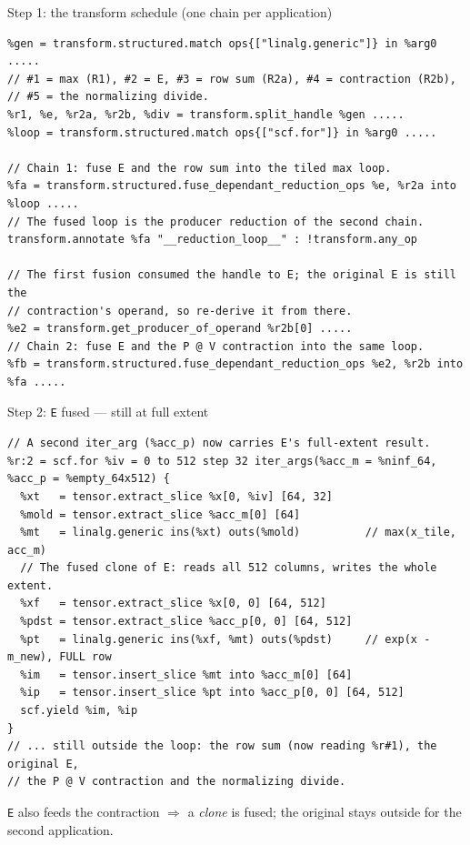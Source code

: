 \documentclass[10pt, aspectratio=169]{beamer}
\newcommand{\code}[1]{\texttt{\small #1}}
\begin{document}
\begin{frame}[fragile]{Step 1: the transform schedule (one chain per application)}
\begin{lstlisting}
%gen = transform.structured.match ops{["linalg.generic"]} in %arg0 .....
// #1 = max (R1), #2 = E, #3 = row sum (R2a), #4 = contraction (R2b),
// #5 = the normalizing divide.
%r1, %e, %r2a, %r2b, %div = transform.split_handle %gen .....
%loop = transform.structured.match ops{["scf.for"]} in %arg0 .....

// Chain 1: fuse E and the row sum into the tiled max loop.
%fa = transform.structured.fuse_dependant_reduction_ops %e, %r2a into %loop .....
// The fused loop is the producer reduction of the second chain.
transform.annotate %fa "__reduction_loop__" : !transform.any_op

// The first fusion consumed the handle to E; the original E is still the
// contraction's operand, so re-derive it from there.
%e2 = transform.get_producer_of_operand %r2b[0] .....
// Chain 2: fuse E and the P @ V contraction into the same loop.
%fb = transform.structured.fuse_dependant_reduction_ops %e2, %r2b into %fa .....
\end{lstlisting}
\end{frame}

\begin{frame}[fragile]{Step 2: \code{E} fused --- still at full extent}
\begin{lstlisting}
// A second iter_arg (%acc_p) now carries E's full-extent result.
%r:2 = scf.for %iv = 0 to 512 step 32 iter_args(%acc_m = %ninf_64, %acc_p = %empty_64x512) {
  %xt   = tensor.extract_slice %x[0, %iv] [64, 32]
  %mold = tensor.extract_slice %acc_m[0] [64]
  %mt   = linalg.generic ins(%xt) outs(%mold)          // max(x_tile, acc_m)
  // The fused clone of E: reads all 512 columns, writes the whole extent.
  %xf   = tensor.extract_slice %x[0, 0] [64, 512]
  %pdst = tensor.extract_slice %acc_p[0, 0] [64, 512]
  %pt   = linalg.generic ins(%xf, %mt) outs(%pdst)     // exp(x - m_new), FULL row
  %im   = tensor.insert_slice %mt into %acc_m[0] [64]
  %ip   = tensor.insert_slice %pt into %acc_p[0, 0] [64, 512]
  scf.yield %im, %ip
}
// ... still outside the loop: the row sum (now reading %r#1), the original E,
// the P @ V contraction and the normalizing divide.
\end{lstlisting}
  \small \code{E} also feeds the contraction $\Rightarrow$ a \emph{clone} is fused;
  the original stays outside for the second application.
\end{frame}
\end{document}
